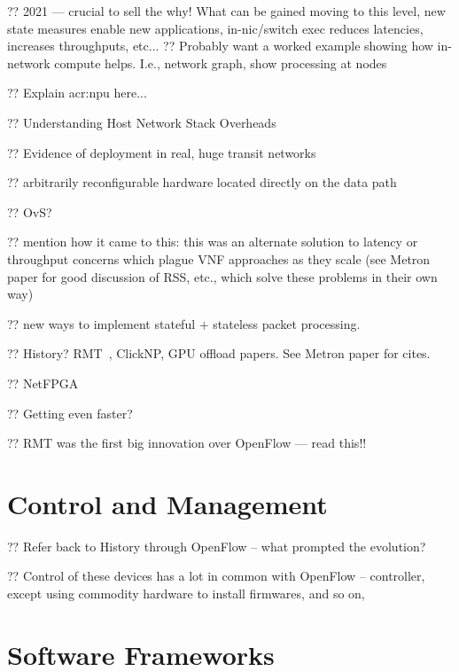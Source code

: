 ?? 2021 --- crucial to sell the why! What can be gained moving to this level, new state measures enable new applications, in-nic/switch exec reduces latencies, increases throughputs, etc...
?? Probably want a worked example showing how in-network compute helps. I.e., network graph, show processing at nodes

?? Explain \gls{acr:npu} here...

?? Understanding Host Network Stack Overheads~\parencite{DBLP:conf/sigcomm/CaiCVH021}

?? Evidence of deployment in real, huge transit networks~

?? arbitrarily reconfigurable hardware located directly on the data path

?? OvS?~\parencite{DBLP:conf/sigcomm/TuWAP21}

?? mention how it came to this: this was an alternate solution to latency or throughput concerns which plague VNF approaches as they scale (see Metron paper for good discussion of RSS, etc., which solve these problems in their own way)

?? new ways to implement stateful + stateless packet processing.

?? History? RMT~\parencite{DBLP:conf/sigcomm/BosshartGKVMIMH13}, ClickNP, GPU offload papers. See Metron paper for cites.

?? NetFPGA~\parencite{DBLP:conf/fpga/IbanezBMZ19}

?? Getting even faster?~\parencite{nokia-fp5}


?? RMT was the first big innovation over OpenFlow --- read this!!

\section{Control and Management}

?? Refer back to History through OpenFlow -- what prompted the evolution?

?? Control of these devices has a lot in common with OpenFlow -- controller, except using commodity hardware to install firmwares, and so on,

\section{Software Frameworks}

